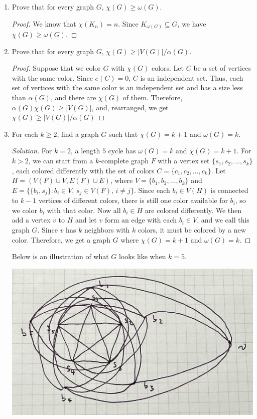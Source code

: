 \documentclass{article}
\begin{document}
\begin{enumerate}[label=(\alph*)]
    \item Prove that for every graph $G$, $\chi(G) \geq \omega(G)$.

    \begin{proof}
        We know that $\chi(K_n) = n$. Since $K_{\omega(G)} \subseteq G$, we have $\chi(G) \geq \omega(G)$.
    \end{proof}

    \item Prove that for every graph $G$, $\chi(G) \geq |V(G)|/\alpha(G)$.

    \begin{proof}
        Suppose that we color $G$ with $\chi(G)$ colors. Let $C$ be a set of vertices with the same color. Since $e(C) = 0$, $C$ is an independent set. Thus, each set of vertices with the same color is an independent set and has a size less than $\alpha(G)$, and there are $\chi(G)$ of them. Therefore, $\alpha(G)\chi(G) \geq |V(G)|$, and, rearranged, we get $\chi(G) \geq |V(G)| / \alpha(G)$
    \end{proof}
    
    \item For each $k \geq 2$, find a graph $G$ such that $\chi(G) = k + 1$ and $\omega(G) = k$.
    
    \begin{proof}[Solution]
        For $k = 2$, a length $5$ cycle has $\omega(G) = k$ and $\chi(G) = k + 1$. For $k > 2$, we can start from a $k$-complete graph $F$ with a vertex set $\{s_1, s_2, \dots, s_k\}$, each colored differently with the set of colors $C = \{c_1, c_2, \dots, c_k\}$. Let $H = (V(F) \cup V, E(F) \cup E)$, where $V = \{b_1, b_2, \dots, b_k\}$ and $E = \{\{b_i, s_j\} : b_i \in V, \, s_j \in V(F), \, i \neq j\}$. Since each $b_i \in V(H)$ is connected to $k - 1$ vertices of different colors, there is still one color available for $b_i$, so we color $b_i$ with that color. Now all $b_i \in H$ are colored differently. We then add a vertex $v$ to $H$ and let $v$ form an edge with each $b_i \in V$, and we call this graph $G$. Since $v$ has $k$ neighbors with $k$ colors, it must be colored by a new color. Therefore, we get a graph $G$ where $\chi(G) = k + 1$ and $\omega(G) = k$. 
    \end{proof}

    Below is an illustration of what $G$ looks like when $k = 5$.

    \includegraphics[width=.7\textwidth]{Q4714}
\end{enumerate}
\end{document}
